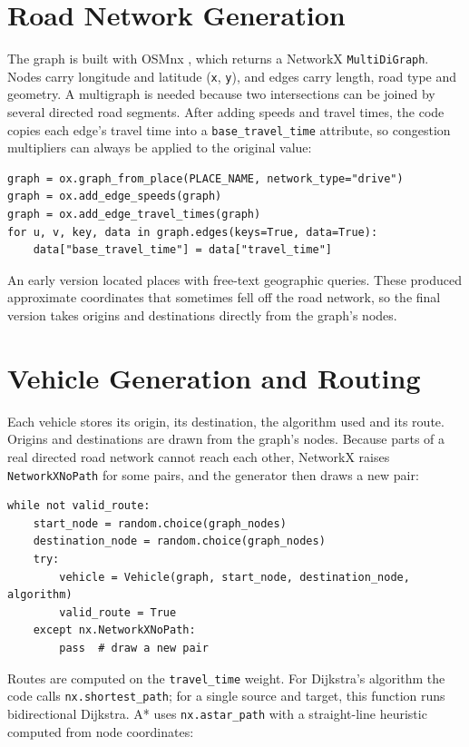 \documentclass[12pt]{report}
\newcommand{\code}[1]{\texttt{#1}}
\begin{document}
\section{Road Network Generation}

The graph is built with OSMnx \citep{boeing2017osmnx}, which returns a NetworkX \code{MultiDiGraph}. Nodes carry longitude and latitude (\code{x}, \code{y}), and edges carry length, road type and geometry. A multigraph is needed because two intersections can be joined by several directed road segments. After adding speeds and travel times, the code copies each edge's travel time into a \code{base\_travel\_time} attribute, so congestion multipliers can always be applied to the original value:

\begin{lstlisting}
graph = ox.graph_from_place(PLACE_NAME, network_type="drive")
graph = ox.add_edge_speeds(graph)
graph = ox.add_edge_travel_times(graph)
for u, v, key, data in graph.edges(keys=True, data=True):
    data["base_travel_time"] = data["travel_time"]
\end{lstlisting}

An early version located places with free-text geographic queries. These produced approximate coordinates that sometimes fell off the road network, so the final version takes origins and destinations directly from the graph's nodes.

\section{Vehicle Generation and Routing}

Each vehicle stores its origin, its destination, the algorithm used and its route. Origins and destinations are drawn from the graph's nodes. Because parts of a real directed road network cannot reach each other, NetworkX raises \code{NetworkXNoPath} for some pairs, and the generator then draws a new pair:

\begin{lstlisting}
while not valid_route:
    start_node = random.choice(graph_nodes)
    destination_node = random.choice(graph_nodes)
    try:
        vehicle = Vehicle(graph, start_node, destination_node, algorithm)
        valid_route = True
    except nx.NetworkXNoPath:
        pass  # draw a new pair
\end{lstlisting}

Routes are computed on the \code{travel\_time} weight. For Dijkstra's algorithm the code calls \code{nx.shortest\_path}; for a single source and target, this function runs bidirectional Dijkstra. A* uses \code{nx.astar\_path} with a straight-line heuristic computed from node coordinates:
\end{document}
